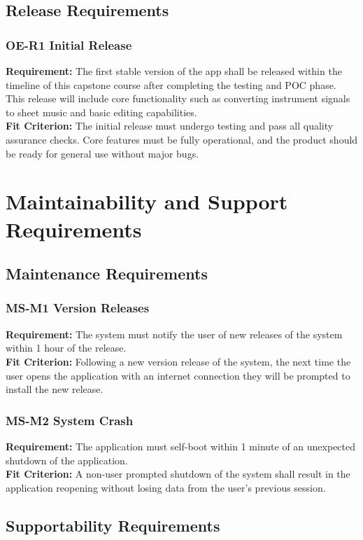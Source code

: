 \documentclass[12pt]{article}
\begin{document}
\subsection{Release Requirements}
\subsubsection*{OE-R1 Initial Release} \label{OE-R1}
\textbf{Requirement:} The first stable version of the app shall be released within the timeline of this capstone course after completing the testing and POC phase. This release will include core functionality such as converting instrument signals to sheet music and basic editing capabilities.\\
\textbf{Fit Criterion:} The initial release must undergo testing and pass all quality assurance checks. Core features must be fully operational, and the product should be ready for general use without major bugs.


\section{Maintainability and Support Requirements}
\subsection{Maintenance Requirements}
\subsubsection*{MS-M1 Version Releases} \label{MS-M1}
\textbf{Requirement:} The system must notify the user of new releases of the system within 1 hour of the release. \\ 
\textbf{Fit Criterion:} Following a new version release of the system, the next time the user opens the application with an internet connection they will be prompted to install the new release. 
\subsubsection*{MS-M2 System Crash} \label{MS-M2}
\textbf{Requirement:} The application must self-boot within 1 minute of an unexpected shutdown of the application. \\ 
\textbf{Fit Criterion:} A non-user prompted shutdown of the system shall result in the application reopening without losing data from the user’s previous session.

\subsection{Supportability Requirements}
\end{document}

